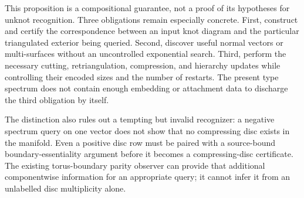 This proposition is a compositional guarantee, not a proof of its
hypotheses for unknot recognition. Three obligations remain especially
concrete. First, construct and certify the correspondence between an
input knot diagram and the particular triangulated exterior being
queried. Second, discover useful normal vectors or multi-surfaces without
an uncontrolled exponential search. Third, perform the necessary cutting,
retriangulation, compression, and hierarchy updates while controlling
their encoded sizes and the number of restarts. The present type spectrum
does not contain enough embedding or attachment data to discharge the
third obligation by itself.

The distinction also rules out a tempting but invalid recognizer: a
negative spectrum query on one vector does not show that no compressing
disc exists in the manifold. Even a positive disc row must be paired with
a source-bound boundary-essentiality argument before it becomes a
compressing-disc certificate. The existing torus-boundary parity observer
can provide that additional componentwise information for an appropriate
query; it cannot infer it from an unlabelled disc multiplicity alone.
